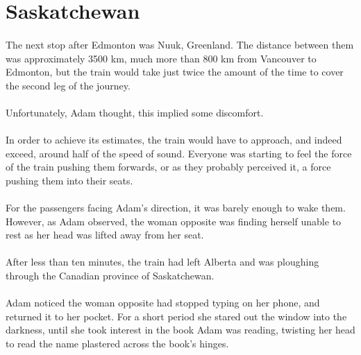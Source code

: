 \documentclass{article}
\begin{document}
\section{Saskatchewan}

\paragraph{}
The next stop after Edmonton was Nuuk, Greenland. The distance between them was approximately 3500 km, much more than 800 km from Vancouver to Edmonton, but the train would take just twice the amount of the time to cover the second leg of the journey.

\paragraph{}
Unfortunately, Adam thought, this implied some discomfort.

\paragraph{}
In order to achieve its estimates, the train would have to approach, and indeed exceed, around half of the speed of sound. Everyone was starting to feel the force of the train pushing them forwards, or as they probably perceived it, a force pushing them into their seats.

\paragraph{}
For the passengers facing Adam's direction, it was barely enough to wake them. However, as Adam observed, the woman opposite was finding herself unable to rest as her head was lifted away from her seat.

\paragraph{}
After less than ten minutes, the train had left Alberta and was ploughing through the Canadian province of Saskatchewan.

\paragraph{}
Adam noticed the woman opposite had stopped typing on her phone, and returned it to her pocket. For a short period she stared out the window into the darkness, until she took interest in the book Adam was reading, twisting her head to read the name plastered across the book's hinges.
\end{document}
